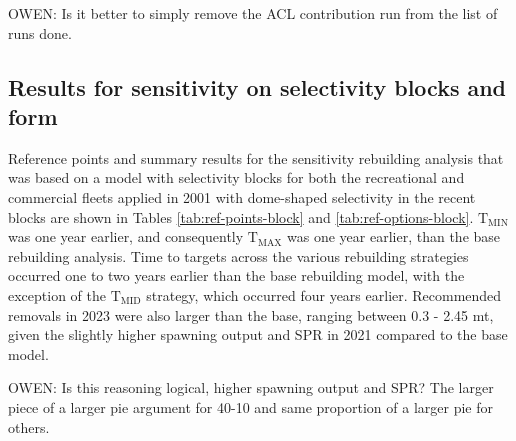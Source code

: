 \documentclass[11pt,
  english,
  a4paper,
]{article}
\begin{document}

OWEN: Is it better to simply remove the ACL contribution run from the list of runs done.

\leavevmode\tagmcend\tagstructend\par


\hypertarget{results-for-sensitivity-on-selectivity-blocks-and-form}{%
\subsection{Results for sensitivity on selectivity blocks and form}\label{results-for-sensitivity-on-selectivity-blocks-and-form}}

\leavevmode\tagmcend\tagstructend


Reference points and summary results for the sensitivity rebuilding analysis that was based on a model with selectivity blocks for both the recreational and commercial fleets applied in 2001 with dome-shaped selectivity in the recent blocks are shown in Tables \ref{tab:ref-points-block} and \ref{tab:ref-options-block}. {\(\text{T}_\text{MIN}\)\leavevmode\tagmcend\tagstructend} was one year earlier, and consequently {\(\text{T}_\text{MAX}\)\leavevmode\tagmcend\tagstructend} was one year earlier, than the base rebuilding analysis. Time to targets across the various rebuilding strategies occurred one to two years earlier than the base rebuilding model, with the exception of the {\(\text{T}_\text{MID}\)\leavevmode\tagmcend\tagstructend} strategy, which occurred four years earlier. Recommended removals in 2023 were also larger than the base, ranging between 0.3 - 2.45 mt, given the slightly higher spawning output and SPR in 2021 compared to the base model.

\leavevmode\tagmcend\tagstructend\par


OWEN: Is this reasoning logical, higher spawning output and SPR? The larger piece of a larger pie argument for 40-10 and same proportion of a larger pie for others.

\leavevmode\tagmcend\tagstructend\par
\end{document}
